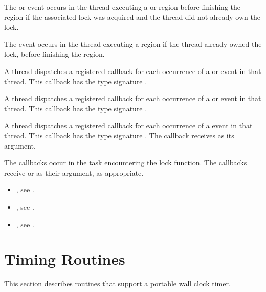 The  or  event occurs in the thread 
executing a  or  region
before finishing the region if the associated lock was acquired and the thread did not already own the lock. 

The  event occurs in the thread 
executing a  region
if the thread already owned the lock, 
before finishing the region.


\tools

A thread dispatches a registered 
callback for each occurrence of a  or  event 
in that thread.  This callback has the type signature .

A thread dispatches a registered 
callback for each occurrence of a  or  event 
in that thread.  This callback has the type signature .

A thread dispatches a registered 
callback for each occurrence of a  event 
in that thread. This callback has the type signature .
The callback receives  as its  argument.

The callbacks occur in the task encountering
the lock function.  The callbacks receive  or 
  as their  argument, as appropriate.


\crossreferences
\begin{itemize}
\item {}, see 
.
\item {}, see 
.
\item {}, see
.
\end{itemize}









\section{Timing Routines}
\label{sec:Timing Routines}
This section describes routines that support a portable wall clock timer.

